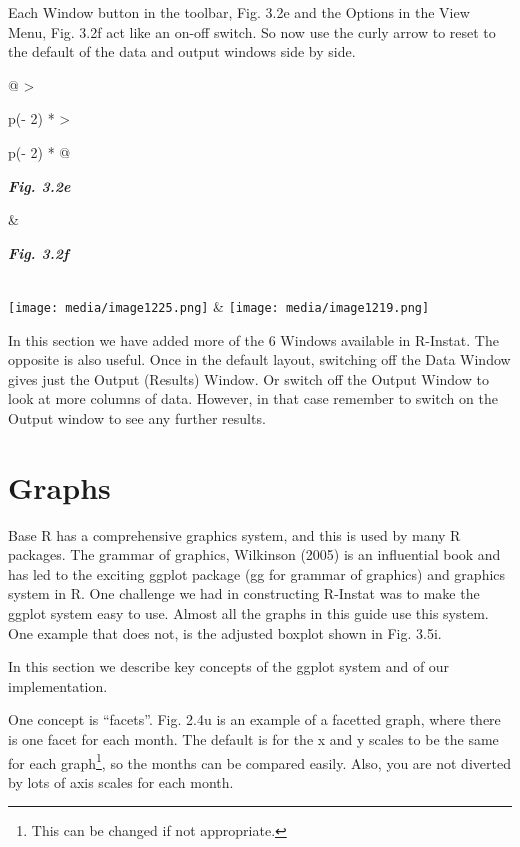 \documentclass[
  letterpaper,
  DIV=11,
  numbers=noendperiod]{scrreprt}
\begin{document}
Each Window button in the toolbar, Fig. 3.2e and the Options in the View
Menu, Fig. 3.2f act like an on-off switch. So now use the curly arrow to
reset to the default of the data and output windows side by side.

\begin{longtable}[]{@{}
  >{\raggedright\arraybackslash}p{(\columnwidth - 2\tabcolsep) * }
  >{\raggedright\arraybackslash}p{(\columnwidth - 2\tabcolsep) * }@{}}
\toprule\noalign{}
\begin{minipage}[b]{\linewidth}\raggedright
\textbf{\emph{Fig. 3.2e}}
\end{minipage} & \begin{minipage}[b]{\linewidth}\raggedright
\textbf{\emph{Fig. 3.2f}}
\end{minipage} \\
\midrule\noalign{}
\endhead
\bottomrule\noalign{}
\endlastfoot
\texttt{[image: media/image1225.png]}
&
\texttt{[image: media/image1219.png]} \\
\end{longtable}

In this section we have added more of the 6 Windows available in
R-Instat. The opposite is also useful. Once in the default layout,
switching off the Data Window gives just the Output (Results) Window. Or
switch off the Output Window to look at more columns of data. However,
in that case remember to switch on the Output window to see any further
results.

\section{Graphs}\label{graphs}

Base R has a comprehensive graphics system, and this is used by many R
packages. The grammar of graphics, Wilkinson (2005) is an influential
book and has led to the exciting ggplot package (gg for grammar of
graphics) and graphics system in R. One challenge we had in constructing
R-Instat was to make the ggplot system easy to use. Almost all the
graphs in this guide use this system. One example that does not, is the
adjusted boxplot shown in Fig. 3.5i.

In this section we describe key concepts of the ggplot system and of our
implementation.

One concept is ``facets''. Fig. 2.4u is an example of a facetted graph,
where there is one facet for each month. The default is for the x and y
scales to be the same for each graph\footnote{This can be changed if not
  appropriate.}, so the months can be compared easily. Also, you are not
diverted by lots of axis scales for each month.
\end{document}
